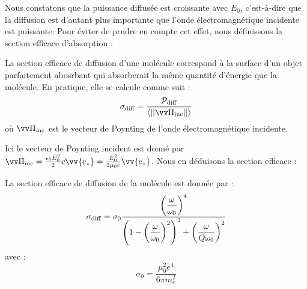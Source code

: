 \documentclass[11pt,fleqn]{book} %
\begin{document}
Nous constatons que la puissance diffusée est croissante avec $E_0$, c'est-à-dire que la diffusion est d'autant plus importante que l'onde électromagnétique incidente est puissante. Pour éviter de prndre en compte cet effet, nous définissons la section efficace d'absorption :
\begin{definition}
	La section efficace de diffusion d'une molécule correspond à la surface d'un objet parfaitement abosrbant qui absorberait la même quantité d'énergie que la molécule. En pratique, elle se calcule comme suit :
	\begin{equation}
		\sigma_{\rm diff} = \frac{\mathcal{P}_{\rm diff}}{\langle || \vv \Pi_{\rm inc}|| \rangle}
	\end{equation}
	où $\vv \Pi_{\rm inc}$ est le vecteur de Poynting de l'onde électromagnétique incidente.
\end{definition}

Ici le vecteur de Poynting incident est donné par $\vv \Pi_{\rm inc} = \frac{\epsilon_0 E_0^2}{2} c \vv{e_z} = \frac{E_0^2}{2 \mu_0 c} \vv{e_z}$. Nous en déduisons la section efficace :
\begin{proposition}
	La section efficace de diffusion de la molécule est donnée par :
	\begin{equation}
		\sigma_{\rm diff} = \sigma_0 \frac{\left( \dfrac{\omega}{\omega_0}\right)^4}{\left(1 - \left(\dfrac{\omega}{\omega_0}\right)^2 \right)^2 + \left(\dfrac{\omega}{Q \omega_0}\right)^2}
	\end{equation}
	avec :
	\begin{equation}
		\sigma_0 = \frac{\mu_0^2 e^4}{6 \pi m_e^2}
	\end{equation}
\end{proposition}
\end{document}
